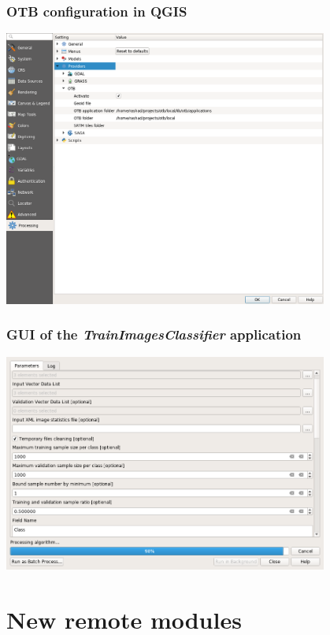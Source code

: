 \documentclass[8pt]{beamer}
\begin{document}
\begin{frame}
\frametitle{OTB configuration in QGIS}
\begin{center}
\includegraphics[width=0.8\textwidth]{images/qgis_otb_provider_config.png}
\end{center} 
\end{frame}

\begin{frame}
\frametitle{GUI of the \textit{TrainImagesClassifier} application}
\begin{center}
\includegraphics[width=0.8\textwidth]{images/qgis_train_classif.png}
\end{center} 
\end{frame}

\section{New remote modules}
\end{document}
